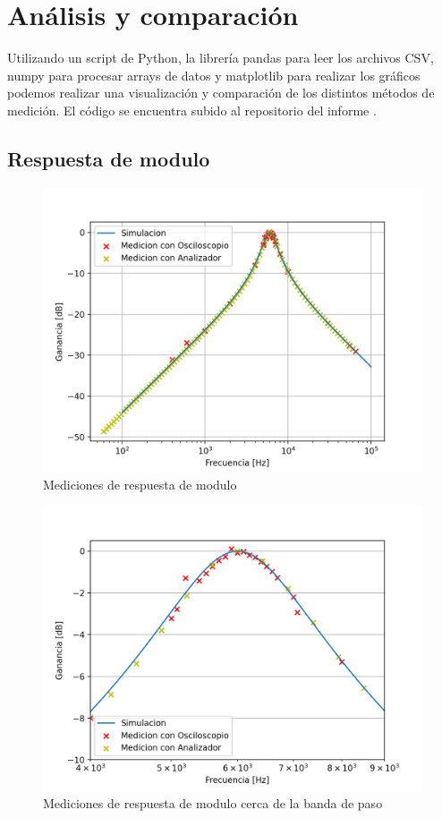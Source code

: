 \documentclass[11pt,a4paper]{report}
\begin{document}
\chapter{Análisis y comparación}

Utilizando un script de Python, la librería pandas para leer los archivos CSV, numpy para procesar arrays de datos y matplotlib para realizar los gráficos podemos realizar una visualización y comparación de los distintos métodos de medición.
El código se encuentra subido al repositorio del informe \cite{notebook}.

\section{Respuesta de modulo}

\begin{figure}[H]
\centering
\includegraphics[scale=0.7]{figs/plots/mag.png}
\caption{Mediciones de respuesta de modulo}
\end{figure}

\begin{figure}[H]
\centering
\includegraphics[scale=0.7]{figs/plots/mag_zoom.png}
\caption{Mediciones de respuesta de modulo cerca de la banda de paso}
\end{figure}
\end{document}
